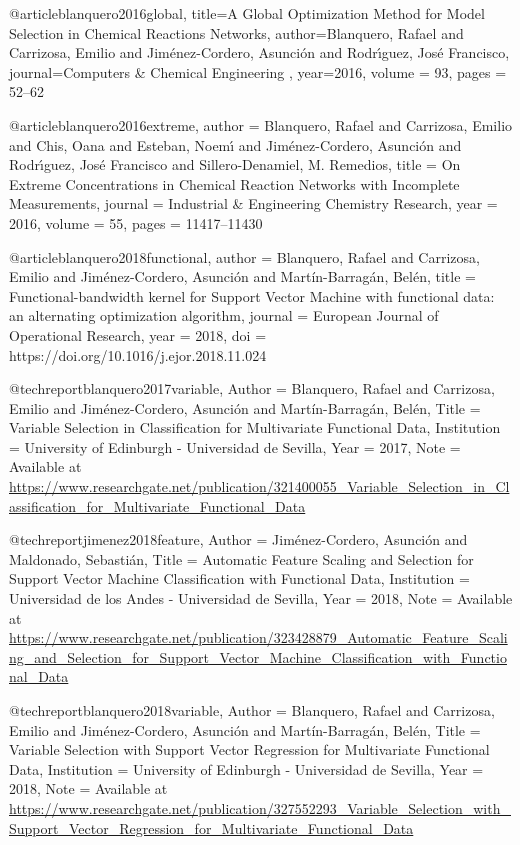 @article{blanquero2016global,
  title={A Global Optimization Method for Model Selection in Chemical Reactions Networks},
  author={Blanquero, Rafael and Carrizosa, Emilio and Jim{\'e}nez-Cordero, Asunci{\'o}n and Rodr{\'\i}guez, Jos{\'e} Francisco},
  journal={Computers \& Chemical Engineering },
  year={2016},
  volume = {93},
  pages = {52--62}
}

@article{blanquero2016extreme,
author = {Blanquero, Rafael and Carrizosa, Emilio and Chis, Oana and Esteban, Noem{\'\i} and Jim{\'e}nez-Cordero, Asunci{\'o}n and Rodr{\'\i}guez, Jos{\'e} Francisco and Sillero-Denamiel, M. Remedios},
title = {On Extreme Concentrations in Chemical Reaction Networks with Incomplete Measurements},
journal = {Industrial \& Engineering Chemistry Research},
year = {2016},
volume = {55},
pages = {11417--11430}
}

@article{blanquero2018functional,
author = {Blanquero, Rafael and Carrizosa, Emilio and Jim\'enez-Cordero, Asunci\'on and Mart\'in-Barrag\'an, Bel\'en},
title = {Functional-bandwidth kernel for Support Vector Machine with functional data: an alternating optimization algorithm},
journal = {European Journal of Operational Research},
year = {2018},
doi = {https://doi.org/10.1016/j.ejor.2018.11.024}
}


@techreport{blanquero2017variable,
  Author = {Blanquero, Rafael and Carrizosa, Emilio and Jim\'enez-Cordero, Asunci\'on and Mart\'in-Barrag\'an, Bel\'en},
  Title = {Variable Selection in Classification for Multivariate Functional Data},
  Institution = {University of Edinburgh - Universidad de Sevilla},
  Year = {2017},
  Note = {Available at \url{https://www.researchgate.net/publication/321400055_Variable_Selection_in_Classification_for_Multivariate_Functional_Data}  }
}

@techreport{jimenez2018feature,
  Author = {Jim\'enez-Cordero, Asunci\'on and Maldonado, Sebasti\'an},
  Title = {Automatic Feature Scaling and Selection for Support Vector Machine Classification with Functional Data},
  Institution = {Universidad de los Andes - Universidad de Sevilla},
  Year = {2018},
  Note = {Available at \url{https://www.researchgate.net/publication/323428879_Automatic_Feature_Scaling_and_Selection_for_Support_Vector_Machine_Classification_with_Functional_Data}  }
}

@techreport{blanquero2018variable,
  Author = {Blanquero, Rafael and Carrizosa, Emilio and Jim\'enez-Cordero, Asunci\'on and Mart\'in-Barrag\'an, Bel\'en},
  Title = {Variable Selection with Support Vector Regression for Multivariate Functional Data},
  Institution = {University of Edinburgh - Universidad de Sevilla},
  Year = {2018},
  Note = {Available at \url{https://www.researchgate.net/publication/327552293_Variable_Selection_with_Support_Vector_Regression_for_Multivariate_Functional_Data}  }
}

